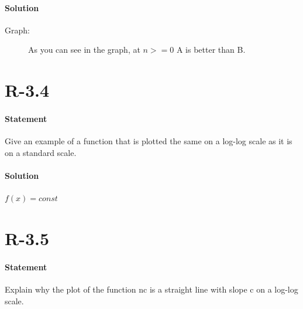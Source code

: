 \documentclass{article}
\begin{document}
\paragraph{Solution}
Graph:
  \begin{figure}[h]
    \begin{center}
    \caption{As you can see in the graph, at $n>=0$ A is better than B.}
    \end{center}
  \end{figure}
\newpage

\section{R-3.4}
\paragraph{Statement}
Give an example of a function that is plotted the same on a log-log scale
as it is on a standard scale.
\paragraph{Solution}
  $f(x)=const$
\section{R-3.5}
\paragraph{Statement}
Explain why the plot of the function nc is a straight line with slope c on a
log-log scale.
\end{document}
